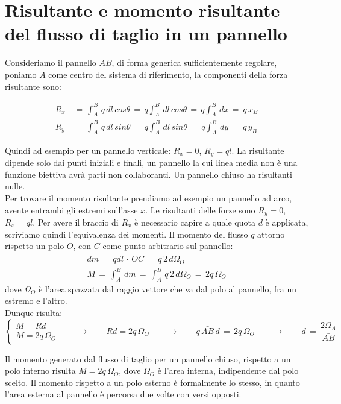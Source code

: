 \section{Risultante e momento risultante del flusso di taglio in un pannello}

Consideriamo il pannello $AB$, di forma generica sufficientemente regolare, poniamo $A$ come centro del sistema di riferimento, la componenti della forza risultante sono:

\begin{align*}
    R_x \,&=\, \int_A^B \,q\,dl\, cos \theta  \,=\,q \int_A^B \,dl\, cos \theta  \,=\,q \int_A^B \,dx \,=\ q \,x_B\\
      R_y \,&=\, \int_A^B \,q\,dl\, sin \theta  \,=\,q \int_A^B \,dl\, sin \theta  \,=\,q \int_A^B \,dy \,=\ q \,y_B
\end{align*}

Quindi ad esempio per un pannello verticale: $R_x = 0$, $R_y = ql$. La risultante dipende solo dai punti iniziali e finali, un pannello la cui linea media non è una funzione biettiva avrà parti non collaboranti. Un pannello chiuso ha risultanti nulle.\\
Per trovare il momento risultante prendiamo ad esempio un pannello ad arco, avente entrambi gli estremi sull'asse $x$. Le risultanti delle forze sono $R_y = 0$, $R_x = ql$. Per avere il braccio di $R_x$ è necessario capire a quale quota $d$ è applicata, scriviamo quindi l'equivalenza dei momenti. Il momento del flusso $   q$  attorno rispetto un polo $O$, con $C$ come punto arbitrario sul pannello:
\begin{align*}
    dm \,=\, qdl \,\cdot \, \bar{OC}\,=\,q\,2\, d\Omega_O\\
    M\,=\, \int_A^B \,dm\,=\,  \int_A^B \,q\,2\,d\Omega_O\,=\,2q\,\Omega_O
\end{align*}
dove $\Omega_O$ è l'area spazzata dal raggio vettore che va dal polo al pannello, fra un estremo e l'altro.\\
Dunque risulta:
\begin{equation*}
    \begin{cases}
        M=Rd\\
        M = 2q\,\Omega_O
    \end{cases}
    \quad\quad \rightarrow\quad\quad
    Rd= 2q\,\Omega_O
    \quad\quad \rightarrow\quad\quad
    q\,\bar{AB}\,d\,=\,2q\,\Omega_O
    \quad\quad \rightarrow\quad\quad
    d \,=\, \frac{2 \Omega_A}{\bar{AB}}
\end{equation*}

Il momento generato dal flusso di taglio per un pannello chiuso, rispetto a un polo interno risulta $M = 2q\,\Omega_O$, dove $\Omega_O$ è l'area interna, indipendente dal polo scelto. Il momento rispetto a un polo esterno è formalmente lo stesso, in quanto l'area esterna al pannello è percorsa due volte con versi opposti.

